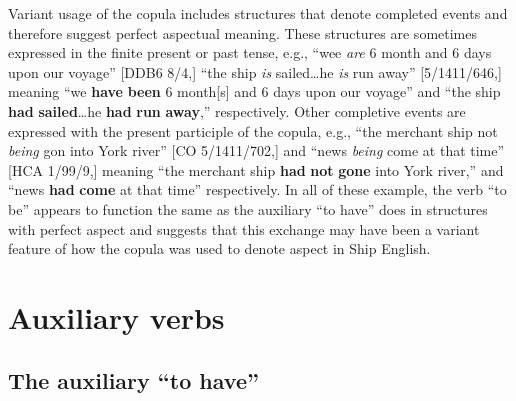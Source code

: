   Variant usage of the copula includes structures that denote completed events and therefore suggest perfect aspectual meaning. These structures are sometimes expressed in the finite present or past tense, e.g., “wee \textit{are} 6 month and 6 days upon our voyage” [DDB6 8/4,] “the ship \textit{is} sailed…he \textit{is} run away” [5/1411/646,] meaning “we \textbf{have} \textbf{been} 6 month[s] and 6 days upon our voyage” and “the ship \textbf{had }\textbf{sailed}…he \textbf{had} \textbf{run} \textbf{away},” respectively. Other completive events are expressed with the present participle of the copula, e.g., “the merchant ship not \textit{being} gon into York river” [CO 5/1411/702,] and “news \textit{being} come at that time” [HCA 1/99/9,] meaning “the merchant ship \textbf{had} \textbf{not} \textbf{gone} into York river,” and “news \textbf{had} \textbf{come} at that time” respectively. In all of these example, the verb “to be” appears to function the same as the auxiliary “to have” does in structures with perfect aspect and suggests that this exchange may have been a variant feature of how the copula was used to denote aspect in Ship English. 

\section{{Auxiliary} {verbs}}%

\subsection{{The} {auxiliary} {“to} {have”}}%

